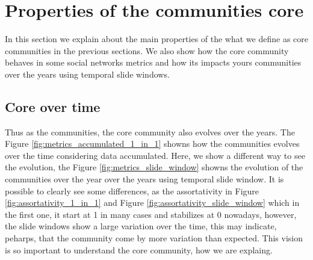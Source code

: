 \section{Properties of the communities core}

In this section we explain about the main properties of the what we define as core communities in the previous sections.
We also show how the core community behaves in some social networks metrics and how its impacts yours communities over 
the years using temporal slide windows.

\subsection{Core over time}
Thus as the communities, the core community also evolves over the years. The Figure \ref{fig:metrics_accumulated_1_in_1}
showns how the communities evolves over the time considering data accumulated. Here, we show a different way to see the evolution,
the Figure \ref{fig:metrics_slide_window} showns the evolution of the communities over the year over the years using temporal slide 
window. It is possible to clearly see some differences, as the assortativity in Figure \ref{fig:assortativity_1_in_1}
and Figure \ref{fig:assortativity_slide_window} which in the first one, it start at 1 in many cases and stabilizes at 0 
nowadays, however, the slide windows show a large variation over the time, this may indicate, peharps, that the community come by
more variation than expected. This vision is so important to understand the core community, how we are explaing.\\
